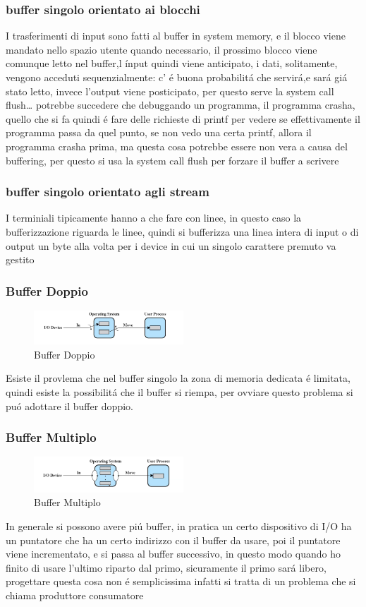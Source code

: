 \subsubsection*{buffer singolo orientato ai blocchi}
I trasferimenti di input sono fatti al buffer in system memory, e il blocco viene mandato nello spazio utente quando necessario,
il prossimo blocco viene comunque letto nel buffer,l ínput quindi viene anticipato, i dati, solitamente, vengono acceduti sequenzialmente:
c' é buona probabilitá che servirá,e sará giá stato letto, invece l'output viene posticipato, per questo serve la system call flush\ldots
potrebbe succedere che debuggando un programma, il programma crasha, quello che si fa quindi é fare delle richieste di printf per
vedere se effettivamente il programma passa da quel punto, se non vedo una certa printf, allora il programma crasha prima, ma
questa cosa potrebbe essere non vera a causa del buffering, per questo si usa la system call flush per forzare il buffer a scrivere
\subsubsection*{buffer singolo orientato agli stream}
I terminiali tipicamente hanno a che fare con linee, in questo caso la bufferizzazione riguarda le linee, quindi si bufferizza una
linea intera di input o di output un byte alla volta per i device in cui un singolo carattere premuto va gestito
\subsubsection*{Buffer Doppio}
\begin{figure}[H]
    \centering
    \includegraphics[width=0.5\textwidth]{immagini/bufferdoppioIO}
    \caption{Buffer Doppio}
\end{figure}
Esiste il provlema che nel buffer singolo la zona di memoria dedicata é limitata, quindi esiste la possibilitá che il buffer
si riempa, per ovviare questo problema si puó adottare il buffer doppio.
\subsubsection*{Buffer Multiplo}
\begin{figure}[H]
    \centering
    \includegraphics[width=0.5\textwidth]{immagini/BufferMultiplo}
    \caption{Buffer Multiplo}
\end{figure}
In generale si possono avere piú buffer, in pratica un certo dispositivo di I/O ha un puntatore che ha un certo
indirizzo con il buffer da usare, poi il puntatore viene incrementato, e si passa al buffer successivo, in questo modo
quando ho finito di usare l'ultimo riparto dal primo, sicuramente il primo sará libero, progettare questa cosa non é
semplicissima infatti si tratta di un problema che si chiama produttore consumatore
